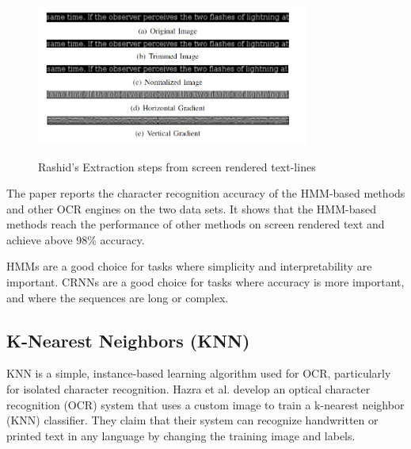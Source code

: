 \begin{figure}[!h]
    \centering
    \includegraphics[width=0.8\textwidth]{Figures/HMM_Rashid.jpg}
    \caption[Rashid's Extraction steps from screen rendered text-lines]{Rashid's Extraction steps from screen rendered text-lines}\cite{rashidEvaluationHMMBasedTechniques2011}
    \label{fig:Rashid Feature Extraction Steps}
\end{figure}

The paper reports the character recognition accuracy of the HMM-based methods and other OCR engines on the two data sets. It shows that the HMM-based methods reach the performance of other methods on screen rendered text and achieve above 98\% accuracy.\cite{rashidEvaluationHMMBasedTechniques2011}

HMMs are a good choice for tasks where simplicity and interpretability are important. CRNNs are a good choice for tasks where accuracy is more important, and where the sequences are long or complex.

\newpage

\subsection{K-Nearest Neighbors (KNN)}

KNN is a simple, instance-based learning algorithm used for OCR, particularly for isolated character recognition. Hazra et al. develop an optical character recognition (OCR) system that uses a custom image to train a k-nearest neighbor (KNN) classifier. They claim that their system can recognize handwritten or printed text in any language by changing the training image and labels. \cite{hazraOpticalCharacterRecognition2017}

